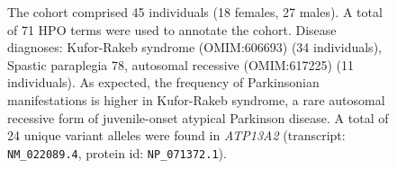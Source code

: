 \begin{figure}[htbp]
\vspace{2em}

\caption{The cohort comprised 45 individuals (18 females, 27 males). A total of 71 HPO terms were used to annotate the cohort. 
Disease diagnoses: Kufor-Rakeb syndrome (OMIM:606693) (34 individuals), Spastic paraplegia 78, autosomal recessive (OMIM:617225) 
(11 individuals). As expected, the frequency of Parkinsonian manifestations is higher in Kufor-Rakeb syndrome,
 a rare autosomal recessive form of juvenile-onset atypical Parkinson disease. A total of 24 unique variant alleles were found in \textit{ATP13A2} (transcript: \texttt{NM\_022089.4}, protein id: \texttt{NP\_071372.1}).}
\end{figure}
